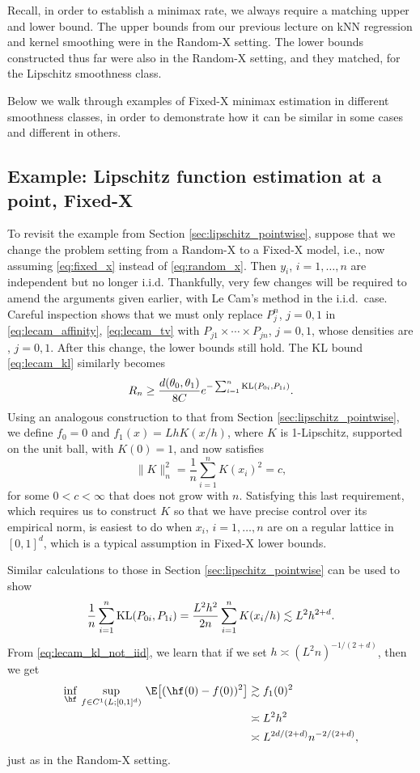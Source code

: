 \documentclass{article}
\begin{document}
Recall, in order to establish a minimax rate, we always require a matching upper 
and lower bound. The upper bounds from our previous lecture on kNN regression
and kernel smoothing were in the Random-X setting. The lower bounds constructed
thus far were also in the Random-X setting, and they matched, for the Lipschitz 
smoothness class.   

Below we walk through examples of Fixed-X minimax estimation in different
smoothness classes, in order to demonstrate how it can be similar in some cases
and different in others.

\subsection{Example: Lipschitz function estimation at a point, Fixed-X} 

To revisit the example from Section \ref{sec:lipschitz_pointwise}, suppose that
we change the problem setting from a Random-X to a Fixed-X model, i.e., now 
assuming \eqref{eq:fixed_x} instead of \eqref{eq:random_x}. Then $y_i$,
$i=1,\dots,n$ are independent but no longer i.i.d. Thankfully, very few changes
will be required to amend the arguments given earlier, with Le Cam's method in
the i.i.d.\ case. Careful inspection shows that we must only replace $P_j^n$, 
$j=0,1$ in \eqref{eq:lecam_affinity}, \eqref{eq:lecam_tv} with $P_{j1} \times
\cdots \times P_{jn}$, $j=0,1$, whose densities are , $j=0,1$. After this
change, the lower bounds still hold. The KL bound \eqref{eq:lecam_kl} similarly
becomes 
\begin{equation}
\label{eq:lecam_kl_not_iid}
R_n \geq \frac{d(\theta_0,\theta_1)}{8C} e^{-\sum_{i=1}^n \mathrm{KL}(P_{0i}, P_{1i})}. 
\end{equation}
Using an analogous construction to that from Section
\ref{sec:lipschitz_pointwise}, we define $f_0=0$ and $f_1(x) = Lh K(x/h)$,
where $K$ is 1-Lipschitz, supported on the unit ball, with $K(0)=1$, and now
satisfies   
\[
\|K\|_n^2 = \frac{1}{n} \sum_{i=1}^n K(x_i)^2 = c,
\]
for some $0 < c < \infty$ that does not grow with $n$. Satisfying this last
requirement, which requires us to construct $K$ so that we have precise control
over its empirical norm, is easiest to do when $x_i$, $i=1,\dots,n$ are on a
regular lattice in $[0,1]^d$, which is a typical assumption in Fixed-X lower
bounds. 

Similar calculations to those in Section \ref{sec:lipschitz_pointwise} can be
used to show  
\[
\frac{1}{n} \sum_{i=1}^n \mathrm{KL}(P_{0i}, P_{1i}) = \frac{L^2 h^2}{2n}
\sum_{i=1}^n K(x_i/h) \lesssim L^2 h^{2+d}.
\]
From \eqref{eq:lecam_kl_not_iid}, we learn that if we set $h \asymp (L^2
n)^{-1/(2+d)}$, then we get
\begin{align*}
\inf_{\hf} \, \sup_{f \in C^1(L; [0,1]^d)} \, \E\big[ (\hf(0) - f(0))^2 \big] 
& \gtrsim f_1(0)^2 \\
&\asymp L^2 h^2 \\
&\asymp L^{2d/(2+d)} n^{-2/(2+d)}, 
\end{align*}
just as in the Random-X setting. 
\end{document}
